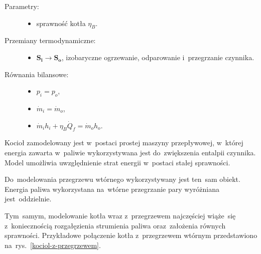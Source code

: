 \begin{description}

	\item[Parametry:] \hfill

		\begin{itemize}

			\item sprawność kotła $\eta_B$.

		\end{itemize}

	\item[Przemiany termodynamiczne:] \hfill

		\begin{itemize}

			\item $\mathbf{S_i} \rightarrow \mathbf{S_o}$,
				izobaryczne ogrzewanie, odparowanie i~przegrzanie
				czynnika.

		\end{itemize}

	\item[Równania bilansowe:] \hfill

		\begin{itemize}

			\item \eq$p_i = p_o$,

			\item \eq$\dot m_i = \dot m_o$,

			\item \eq$\dot m_i h_i + \eta_B \dot Q_f = \dot m_o h_o$.

		\end{itemize}

\end{description}

Kocioł zamodelowany jest w~postaci prostej maszyny przepływowej,
w~której energia zawarta w~paliwie wykorzystywana jest do~zwiększenia
entalpii czynnika. Model umożliwia uwzględnienie strat energii w~postaci
stałej sprawności.

Do~modelowania przegrzewu wtórnego wykorzystywany jest ten~sam obiekt.
Energia paliwa wykorzystana na~wtórne przegrzanie pary wyróżniana
jest~oddzielnie.

Tym~samym, modelowanie kotła wraz z~przegrzewem najczęściej wiąże~się
z~koniecznością rozgałęzienia strumienia paliwa oraz~założenia równych
sprawności. Przykładowe połączenie kotła z~przegrzewem wtórnym
przedstawiono na~rys.~\ref{kociol-z-przegrzewem}.

